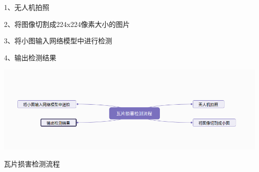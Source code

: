 1、无人机拍照

2、将图像切割成224x224像素大小的图片

3、将小图输入网络模型中进行检测 

4、输出检测结果
\begin{uscfigure}
	\includegraphics[width=\textwidth]{./Pictures/liucheng.png}	
	\caption{瓦片损害检测流程}
	\label{rcnn}
\end{uscfigure}